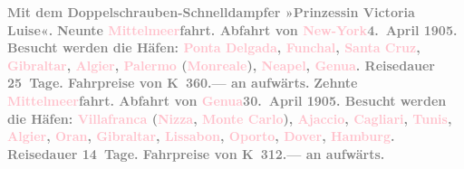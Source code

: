 \documentclass[twoside=false,titlepage=false,open=any, parskip=never, fontsize=12pt, headings=small, chapterprefix=false, appendixprefix=false]{scrbook}
\begin{document}
           {\bigskip}\pstart
           \noindent{}\centering{}\textcolor{gray}{\textbf{Mit dem Doppelschrauben-Schnelldampfer »Prinzessin Victoria
                  Luise«.}}\pend
           \pstart
           \noindent{}\textcolor{gray}{\textbf{\textbf{Neunte \textcolor{pink}{Mittelmeer}{}\ledrightnote{\textcolor{pink}{Mittelmeer}}fahrt.}
                  Abfahrt von \textcolor{pink}{New-York}{}\ledrightnote{\textcolor{pink}{New York City}}{ }\textbf{4. April 1905}. Besucht werden die Häfen: \textcolor{pink}{Ponta Delgada}{}\ledrightnote{\textcolor{pink}{Ponta Delgada}},
                     \textcolor{pink}{Funchal}{}\ledrightnote{\textcolor{pink}{Funchal}}, \textcolor{pink}{Santa
                     Cruz}{}\ledrightnote{\textcolor{pink}{Santa Cruz}}, \textcolor{pink}{Gibraltar}{}\ledrightnote{\textcolor{pink}{Gibraltar}}, \textcolor{pink}{Algier}{}\ledrightnote{\textcolor{pink}{Algiers}}, \textcolor{pink}{Palermo}{}\ledrightnote{\textcolor{pink}{Palermo}} (\textcolor{pink}{Monreale}{}\ledrightnote{\textcolor{pink}{Monreale}}), \textcolor{pink}{Neapel}{}\ledrightnote{\textcolor{pink}{Neapel}}, \textcolor{pink}{Genua}{}\ledrightnote{\textcolor{pink}{Genua}}. Reisedauer 25 Tage.
                  Fahrpreise von \textbf{K 360.—} an aufwärts.}}\pend
           \pstart
           \textcolor{gray}{\textbf{\textbf{Zehnte \textcolor{pink}{Mittelmeer}{}\ledrightnote{\textcolor{pink}{Mittelmeer}}fahrt.}
                  Abfahrt von \textcolor{pink}{Genua}{}\ledrightnote{\textcolor{pink}{Genua}}{ }\textbf{30. April 1905}. Besucht werden die Häfen: \textcolor{pink}{Villafranca}{}\ledrightnote{\textcolor{pink}{Villefranche-sur-Mer}}
                     (\textcolor{pink}{Nizza}{}\ledrightnote{\textcolor{pink}{Nizza}}, \textcolor{pink}{Monte
                     Carlo}{}\ledrightnote{\textcolor{pink}{Monte Carlo}}), \textcolor{pink}{Ajaccio}{}\ledrightnote{\textcolor{pink}{Ajaccio}}, \textcolor{pink}{Cagliari}{}\ledrightnote{\textcolor{pink}{Cagliari}}, \textcolor{pink}{Tunis}{}\ledrightnote{\textcolor{pink}{Tunis}}, \textcolor{pink}{Algier}{}\ledrightnote{\textcolor{pink}{Algiers}}, \textcolor{pink}{Oran}{}\ledrightnote{\textcolor{pink}{Oran}},
                     \textcolor{pink}{Gibraltar}{}\ledrightnote{\textcolor{pink}{Gibraltar}}, \textcolor{pink}{Lissabon}{}\ledrightnote{\textcolor{pink}{Lissabon}}, \textcolor{pink}{Oporto}{}\ledrightnote{\textcolor{pink}{Porto}}, \textcolor{pink}{Dover}{}\ledrightnote{\textcolor{pink}{Dover}}, \textcolor{pink}{Hamburg}{}\ledrightnote{\textcolor{pink}{Hamburg}}. Reisedauer
                  14 Tage. Fahrpreise von \textbf{K 312.—} an aufwärts.}}\pend
\end{document}
